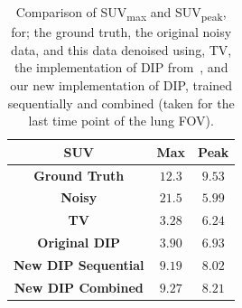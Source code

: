             \begin{table}
                
                \centering
                
                \captionsetup{singlelinecheck=false, justification=centering}
                \caption{
                Comparison of \gls{SUV}\textsubscript{max} and \gls{SUV}\textsubscript{peak}, for; the ground truth, the original noisy data, and this data denoised using, \gls{TV}, the implementation of \gls{DIP} from~\cite{Gong2019PETPrior}, and our new implementation of \gls{DIP}, trained sequentially and combined (taken for the last time point of the lung \gls{FOV}).}
                
                
                \resizebox*{1.0\linewidth}{!}
                {
                    \begin{tabular}{||c|cc||}
                        \hline
                        \textbf{SUV}                & \textbf{Max}  & \textbf{Peak} \\
                        \hline
                        \textbf{Ground Truth}       & $12.3$        & $9.53$ \\
                        \hline
                        \textbf{Noisy}              & $21.5$        & $5.99$ \\
                        \hline
                        \textbf{TV}                 & $3.28$        & $6.24$ \\
                        \textbf{Original DIP}       & $3.90$        & $6.93$ \\
                        \hline
                        \textbf{New DIP Sequential} & $9.19$        & $8.02$ \\
                        \textbf{New DIP Combined}   & $9.27$        & $8.21$ \\
                        \hline
                    \end{tabular}
                }
                \label{tab:pseudo_bayesian_dip_denoising_as_a_preprocessing_step_for_kinetic_modelling_in_dynamic_pet_appendix_results_suv}
                
            \end{table}
            
